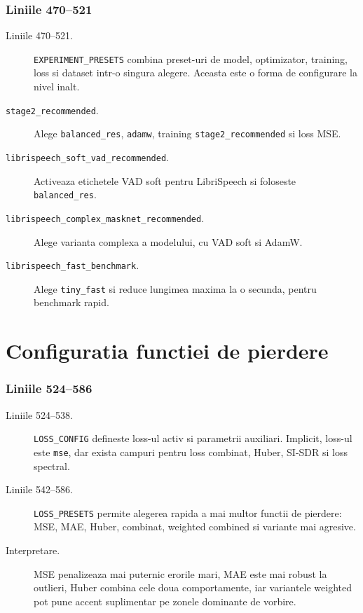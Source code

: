 \documentclass[12pt,a4paper]{report}
\newcommand{\codechunk}[2]{%
\subsection*{Liniile #1--#2}

}
\begin{document}
\codechunk{470}{521}

\begin{description}
    \item[Liniile 470--521.] \texttt{EXPERIMENT\_PRESETS} combina preset-uri de
    model, optimizator, training, loss si dataset intr-o singura alegere. Aceasta
    este o forma de configurare la nivel inalt.

    \item[\texttt{stage2\_recommended}.] Alege \texttt{balanced\_res}, \texttt{adamw},
    training \texttt{stage2\_recommended} si loss MSE.

    \item[\texttt{librispeech\_soft\_vad\_recommended}.] Activeaza etichetele VAD
    soft pentru LibriSpeech si foloseste \texttt{balanced\_res}.

    \item[\texttt{librispeech\_complex\_masknet\_recommended}.] Alege varianta
    complexa a modelului, cu VAD soft si AdamW.

    \item[\texttt{librispeech\_fast\_benchmark}.] Alege \texttt{tiny\_fast} si
    reduce lungimea maxima la o secunda, pentru benchmark rapid.
\end{description}

\chapter{Configuratia functiei de pierdere}

\codechunk{524}{586}

\begin{description}
    \item[Liniile 524--538.] \texttt{LOSS\_CONFIG} defineste loss-ul activ si
    parametrii auxiliari. Implicit, loss-ul este \texttt{mse}, dar exista campuri
    pentru loss combinat, Huber, SI-SDR si loss spectral.

    \item[Liniile 542--586.] \texttt{LOSS\_PRESETS} permite alegerea rapida a mai
    multor functii de pierdere: MSE, MAE, Huber, combinat, weighted combined si
    variante mai agresive.

    \item[Interpretare.] MSE penalizeaza mai puternic erorile mari, MAE este mai
    robust la outlieri, Huber combina cele doua comportamente, iar variantele
    weighted pot pune accent suplimentar pe zonele dominante de vorbire.
\end{description}
\end{document}

